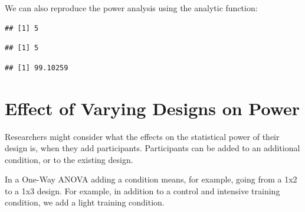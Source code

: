 \documentclass[]{book}
\newenvironment{Shaded}{\begin{snugshade}}{\end{snugshade}}
\newcommand{\KeywordTok}[1]{\textcolor[rgb]{0.13,0.29,0.53}{\textbf{#1}}}
\newcommand{\NormalTok}[1]{#1}
\newcommand{\OperatorTok}[1]{\textcolor[rgb]{0.81,0.36,0.00}{\textbf{#1}}}
\newcommand{\StringTok}[1]{\textcolor[rgb]{0.31,0.60,0.02}{#1}}
\begin{document}
We can also reproduce the power analysis using the analytic function:

\begin{Shaded}
\end{Shaded}

\begin{verbatim}
## [1] 5
\end{verbatim}

\begin{Shaded}
\end{Shaded}

\begin{verbatim}
## [1] 5
\end{verbatim}

\begin{Shaded}
\end{Shaded}

\begin{verbatim}
## [1] 99.10259
\end{verbatim}

\hypertarget{effect-of-varying-designs-on-power}{%
\chapter{Effect of Varying Designs on Power}\label{effect-of-varying-designs-on-power}}

Researchers might consider what the effects on the statistical power of their design is, when they add participants. Participants can be added to an additional condition, or to the existing design.

In a One-Way ANOVA adding a condition means, for example, going from a 1x2 to a 1x3 design. For example, in addition to a control and intensive training condition, we add a light training condition.
\end{document}
